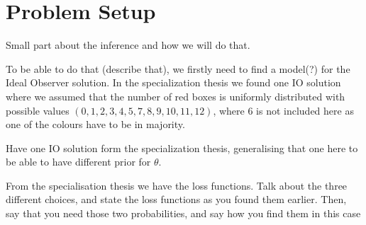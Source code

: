 \newpage
\section{Problem Setup}

Small part about the inference and how we will do that.

To be able to do that (describe that), we firstly need to find a model(?) for the Ideal Observer solution. In the specialization thesis we found one IO solution where we assumed that the number of red boxes is uniformly distributed with possible values $(0,1,2,3,4,5,7,8,9,10,11,12)$, where $6$ is not included here as one of the colours have to be in majority. 


Have one IO solution form the specialization thesis, generalising that one here to be able to have different prior for $\theta$. 

From the specialisation thesis we have the loss functions. Talk about the three different choices, and state the loss functions as you found them earlier. Then, say that you need those two probabilities, and say how you find them in this case 